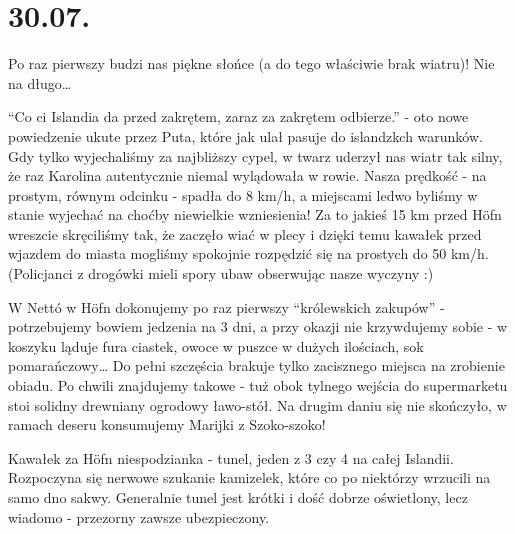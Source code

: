 \chapter*{30.07.}

Po raz pierwszy budzi nas piękne słońce (a do tego właściwie brak wiatru)! Nie na długo…

“Co ci Islandia da przed zakrętem, zaraz za zakrętem odbierze.” - oto nowe powiedzenie ukute przez Puta, które jak ulał pasuje do islandzkch warunków. Gdy tylko wyjechaliśmy za najbliższy cypel, w twarz uderzył nas wiatr tak silny, że raz Karolina autentycznie niemal wylądowała w rowie. Nasza prędkość - na prostym, równym odcinku - spadła do 8 km/h, a miejscami ledwo byliśmy w stanie wyjechać na choćby niewielkie wzniesienia! Za to jakieś 15 km przed Höfn wreszcie skręciliśmy tak, że zaczęło wiać w plecy i dzięki temu kawałek przed wjazdem do miasta mogliśmy spokojnie rozpędzić się na prostych do 50 km/h. (Policjanci z drogówki mieli spory ubaw obserwując nasze wyczyny :)



W Nettó w Höfn dokonujemy po raz pierwszy “królewskich zakupów” - potrzebujemy bowiem jedzenia na 3 dni, a przy okazji nie krzywdujemy sobie - w koszyku ląduje fura ciastek, owoce w puszce w dużych ilościach, sok pomarańczowy… Do pełni szczęścia brakuje tylko zacisznego miejsca na zrobienie obiadu. Po chwili znajdujemy takowe - tuż obok tylnego wejścia do supermarketu stoi solidny drewniany ogrodowy ławo-stół. Na drugim daniu się nie skończyło, w ramach deseru konsumujemy Marijki z Szoko-szoko!


Kawałek za Höfn niespodzianka - tunel, jeden z 3 czy 4 na całej Islandii. Rozpoczyna się nerwowe szukanie kamizelek, które co po niektórzy wrzucili na samo dno sakwy. Generalnie tunel jest krótki i dość dobrze oświetlony, lecz wiadomo - przezorny zawsze ubezpieczony.


